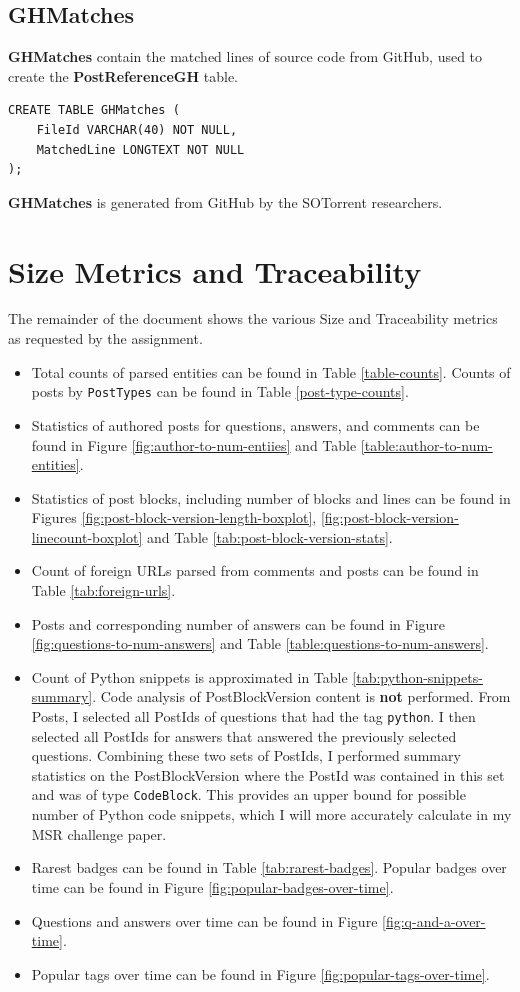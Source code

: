 \documentclass[a4paper,11pt, notitlepage]{report}
\theoremstyle{definition}
\numberwithin{equation}{section}		%
\begin{document}
\subsection{GHMatches}
\textbf{GHMatches} contain the matched lines of source code from GitHub, used to create the \textbf{PostReferenceGH} table.
\begin{lstlisting}
CREATE TABLE GHMatches (
    FileId VARCHAR(40) NOT NULL,
    MatchedLine LONGTEXT NOT NULL
);
\end{lstlisting}
\textbf{GHMatches} is generated from GitHub by the SOTorrent researchers.

\section{Size Metrics and Traceability}

The remainder of the document shows the various Size and Traceability metrics as requested by the assignment.

\begin{itemize}
    \item Total counts of parsed entities can be found in Table \ref{table-counts}. Counts of posts by \texttt{PostTypes} can be found in Table \ref{post-type-counts}.
    \item Statistics of authored posts for questions, answers, and comments can be found in Figure \ref{fig:author-to-num-entiies} and Table \ref{table:author-to-num-entities}.
    \item Statistics of post blocks, including number of blocks and lines can be found in Figures \ref{fig:post-block-version-length-boxplot}, \ref{fig:post-block-version-linecount-boxplot} and Table \ref{tab:post-block-version-stats}.
    \item Count of foreign URLs parsed from comments and posts can be found in Table \ref{tab:foreign-urls}.
    \item Posts and corresponding number of answers can be found in Figure \ref{fig:questions-to-num-answers} and Table \ref{table:questions-to-num-answers}.
    \item Count of Python snippets is approximated in Table \ref{tab:python-snippets-summary}. Code analysis of PostBlockVersion content is \textbf{not} performed. From Posts, I selected all PostIds of questions that had the tag \texttt{python}. I then selected all PostIds for answers that answered the previously selected questions. Combining these two sets of PostIds, I performed summary statistics on the PostBlockVersion where the PostId was contained in this set and was of type \texttt{CodeBlock}. This provides an upper bound for possible number of Python code snippets, which I will more accurately calculate in my MSR challenge paper.
    \item Rarest badges can be found in Table \ref{tab:rarest-badges}. Popular badges over time can be found in Figure \ref{fig:popular-badges-over-time}.
    \item Questions and answers over time can be found in Figure \ref{fig:q-and-a-over-time}.
    \item Popular tags over time can be found in Figure \ref{fig:popular-tags-over-time}.
\end{itemize}
\end{document}
